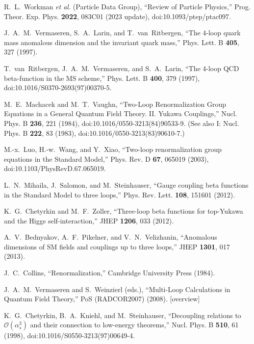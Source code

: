 \documentclass[aps,prd,onecolumn,amsmath,amssymb,superscriptaddress,nofootinbib,showpacs,showkeys]{revtex4-2}
\begin{document}
\begin{thebibliography}{99}
R.~L.~Workman \emph{et al.} (Particle Data Group),
``Review of Particle Physics,''
Prog. Theor. Exp. Phys. \textbf{2022}, 083C01 (2023 update),
doi:10.1093/ptep/ptac097.

J.~A.~M.~Vermaseren, S.~A.~Larin, and T.~van~Ritbergen,
``The 4-loop quark mass anomalous dimension and the invariant quark mass,''
Phys. Lett. B \textbf{405}, 327 (1997).

T.~van~Ritbergen, J.~A.~M.~Vermaseren, and S.~A.~Larin,
``The 4-loop QCD beta-function in the MS scheme,''
Phys. Lett. B \textbf{400}, 379 (1997),
doi:10.1016/S0370-2693(97)00370-5.

M.~E.~Machacek and M.~T.~Vaughn,
``Two-Loop Renormalization Group Equations in a General Quantum Field Theory. II. Yukawa Couplings,''
Nucl. Phys. B \textbf{236}, 221 (1984),
doi:10.1016/0550-3213(84)90533-9. (See also I: Nucl. Phys. B \textbf{222}, 83 (1983), doi:10.1016/0550-3213(83)90610-7.)

M.-x.~Luo, H.-w.~Wang, and Y.~Xiao,
``Two-loop renormalization group equations in the Standard Model,''
Phys. Rev. D \textbf{67}, 065019 (2003),
doi:10.1103/PhysRevD.67.065019.

L.~N.~Mihaila, J.~Salomon, and M.~Steinhauser,
``Gauge coupling beta functions in the Standard Model to three loops,''
Phys. Rev. Lett. \textbf{108}, 151601 (2012).

K.~G.~Chetyrkin and M.~F.~Zoller,
``Three-loop beta functions for top-Yukawa and the Higgs self-interaction,''
JHEP \textbf{1206}, 033 (2012).

A.~V.~Bednyakov, A.~F.~Pikelner, and V.~N.~Velizhanin,
``Anomalous dimensions of SM fields and couplings up to three loops,''
JHEP \textbf{1301}, 017 (2013).

J.~C.~Collins,
``Renormalization,''
Cambridge University Press (1984).

J.~A.~M.~Vermaseren and S.~Weinzierl (eds.),
``Multi-Loop Calculations in Quantum Field Theory,''
PoS (RADCOR2007) (2008). [overview]

K.~G.~Chetyrkin, B.~A.~Kniehl, and M.~Steinhauser,
``Decoupling relations to $\mathcal{O}(\alpha_s^3)$ and their connection to low-energy theorems,''
Nucl. Phys. B \textbf{510}, 61 (1998),
doi:10.1016/S0550-3213(97)00649-4.


\end{thebibliography}
\end{document}
